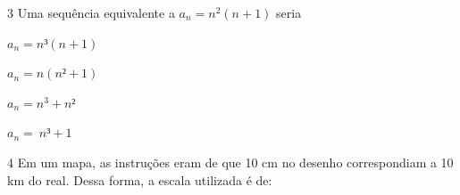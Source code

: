 

\num{3} Uma sequência equivalente a $a_{n} = n^2(n + 1)$ seria

\begin{escolha}
\item $a_{n} = n³(n + 1)$
\item $a_{n} = n(n² + 1)$
\item $a_{n} = n^{3} + n²$
\item $a_{n} = \ n³ + 1$
\end{escolha}



\num{4} Em um mapa, as instruções eram de que 10 cm no desenho correspondiam
a 10 km do real. Dessa forma, a escala utilizada é de:

